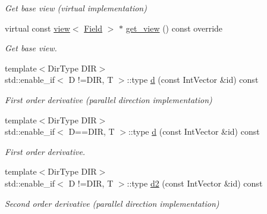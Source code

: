 \begin{DoxyCompactItemize}
\begin{DoxyCompactList}\small\item\em Get base view (virtual implementation) \end{DoxyCompactList}\item 
virtual const \hyperlink{classUintah_1_1PhaseField_1_1detail_1_1view}{view}$<$ \hyperlink{structUintah_1_1PhaseField_1_1ScalarField}{Field} $>$ $\ast$ \hyperlink{classUintah_1_1PhaseField_1_1detail_1_1bc__fd_3_01ScalarField_3_01T_01_4_00_01STN_00_01VAR_00_01ce55d0bf8381798bc129da931b626e80_a68249997b8422670b8831c9b6db4d879}{get\+\_\+view} () const override
\begin{DoxyCompactList}\small\item\em Get base view. \end{DoxyCompactList}\item 
{\footnotesize template$<$Dir\+Type D\+IR$>$ }\\std\+::enable\+\_\+if$<$ D !=D\+IR, T $>$\+::type \hyperlink{classUintah_1_1PhaseField_1_1detail_1_1bc__fd_3_01ScalarField_3_01T_01_4_00_01STN_00_01VAR_00_01ce55d0bf8381798bc129da931b626e80_ac9c8b756ab58e30981e7aeb5c985c825}{d} (const Int\+Vector \&id) const
\begin{DoxyCompactList}\small\item\em First order derivative (parallel direction implementation) \end{DoxyCompactList}\item 
{\footnotesize template$<$Dir\+Type D\+IR$>$ }\\std\+::enable\+\_\+if$<$ D==D\+IR, T $>$\+::type \hyperlink{classUintah_1_1PhaseField_1_1detail_1_1bc__fd_3_01ScalarField_3_01T_01_4_00_01STN_00_01VAR_00_01ce55d0bf8381798bc129da931b626e80_af55ab4dfc36a5f8f14c9cab7fc211771}{d} (const Int\+Vector \&id) const
\begin{DoxyCompactList}\small\item\em First order derivative. \end{DoxyCompactList}\item 
{\footnotesize template$<$Dir\+Type D\+IR$>$ }\\std\+::enable\+\_\+if$<$ D !=D\+IR, T $>$\+::type \hyperlink{classUintah_1_1PhaseField_1_1detail_1_1bc__fd_3_01ScalarField_3_01T_01_4_00_01STN_00_01VAR_00_01ce55d0bf8381798bc129da931b626e80_a0ff4e57d47399e1a0085b00730375b48}{d2} (const Int\+Vector \&id) const
\begin{DoxyCompactList}\small\item\em Second order derivative (parallel direction implementation) \end{DoxyCompactList}\item 

\end{DoxyCompactItemize}

